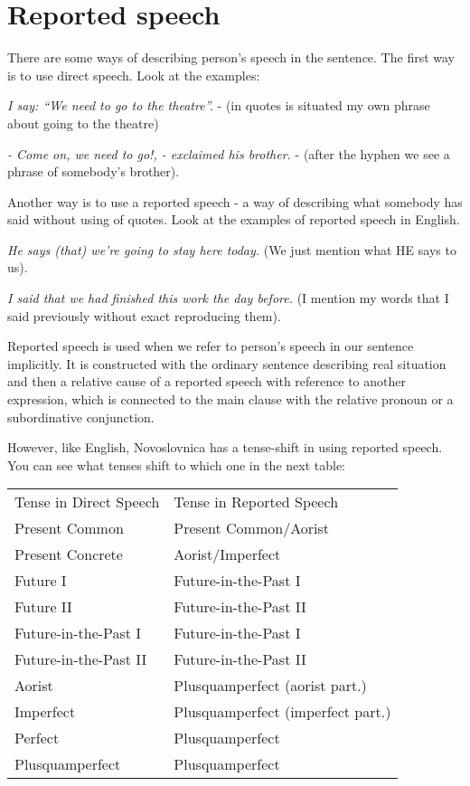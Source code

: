 \section{Reported speech}

There are some ways of describing person’s speech in the sentence. The first way is to use direct speech. Look at the examples:

\textit{I say: “We need to go to the theatre”.} - (in quotes is situated my own phrase about going to the theatre)

\textit{- Come on, we need to go!, - exclaimed his brother.} - (after the hyphen we see a phrase of somebody’s brother).

Another way is to use a reported speech - a way of describing what somebody has said without using of quotes. Look at the examples of reported speech in English.

\textit{He says (that) we’re going to stay here today.} (We just mention what HE says to us).

\textit{I said that we had finished this work the day before.} (I mention my words that I said previously without exact reproducing them).

Reported speech is used when we refer to person’s speech in our sentence implicitly. It is constructed with the ordinary sentence describing real situation and then a relative cause of a reported speech with reference to another expression, which is connected to the main clause with the relative pronoun or a subordinative conjunction.

However, like English, Novoslovnica has a tense-shift in using reported speech. You can see what tenses shift to which one in the next table:

\begin{table}
	\begin{tabular}{ll}
		Tense in Direct Speech & Tense in Reported Speech \\
		Present Common & Present Common/Aorist \\
		Present Concrete & Aorist/Imperfect \\
		Future I & Future-in-the-Past I \\
		Future II & Future-in-the-Past II \\
		Future-in-the-Past I & Future-in-the-Past I \\
		Future-in-the-Past II & Future-in-the-Past II \\
		Aorist & Plusquamperfect (aorist part.) \\
		Imperfect & Plusquamperfect (imperfect part.) \\
		Perfect & Plusquamperfect \\
		Plusquamperfect & Plusquamperfect 
	\end{tabular}
\end{table}


